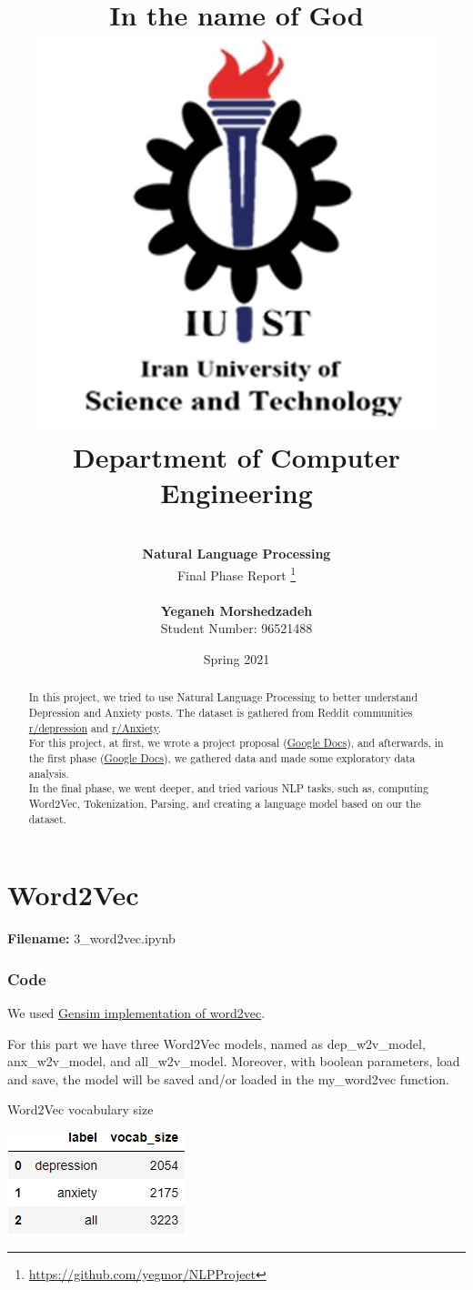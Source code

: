\documentclass[12pt, a4paper]{article}
\title{
	{\Huge \textbf{In the name of God}}
	\\[20pt]
	\includegraphics[width=0.5\linewidth]{../assets/IUST_logo_color_eng.jpg} \\
	{\normalsize Department of Computer Engineering}
}
\author{
	\\[10pt]
	\textbf{{\LARGE Natural Language Processing}}
	\\[10pt]
	\LARGE Final Phase Report
	\thanks{\url{https://github.com/yegmor/NLPProject}}
	
	\\[30pt]
	\textbf{Yeganeh Morshedzadeh}
	\\[5pt]
	Student Number: 96521488
}
\date{Spring 2021}
\begin{document}
	
\maketitle
	
\clearpage
\tableofcontents
\newpage

\listoffigures
\newpage

\listoftables
\newpage

\begin{abstract}
	In this project, we tried to use Natural Language Processing to better understand Depression and Anxiety posts. The dataset is gathered from Reddit communities \href{https://www.reddit.com/r/depression}{r/depression} and \href{https://www.reddit.com/r/Anxiety}{r/Anxiety}.
	\\[10pt]
	
	For this project, at first, we wrote a project proposal (\href{https://docs.google.com/document/d/1tHGEmEgn8-sp8MD72d8NjnZsq-GpVupzsMWgnqaGi-Y/edit?usp=sharing}{Google Docs}), and afterwards, in the first phase (\href{https://docs.google.com/document/d/1Jc2ELhweU01Tbf0WalU7wVQABdAV4w50mhQnmMpU2mM/edit?usp=sharing}{Google Docs}), we gathered data and made some exploratory data analysis. 
	\\[10pt]
	
	In the final phase, we went deeper, and tried various NLP tasks, such as, computing Word2Vec, Tokenization, Parsing, and creating a language model based on our the dataset.
\end{abstract}

\newpage
\part{Word2Vec}
\large{\textbf{Filename:} 3\_word2vec.ipynb}

\section*{Code}
We used \href{https://radimrehurek.com/gensim/models/word2vec.html}{Gensim implementation of word2vec}. 

For this part we have three Word2Vec models, named as dep\_w2v\_model, anx\_w2v\_model, and all\_w2v\_model. Moreover, with boolean parameters, load and save, the model will be saved and/or loaded in the my\_word2vec function.

\begin{table}[H]
	\caption{Word2Vec vocabulary size} 
	\centering 
	\vspace{5mm} 
	\includegraphics[width=0.5\linewidth]{../reports/images/w2v_vocab-size.png}
	\label{w2v_vocab-size} 
\end{table}
\end{document}
